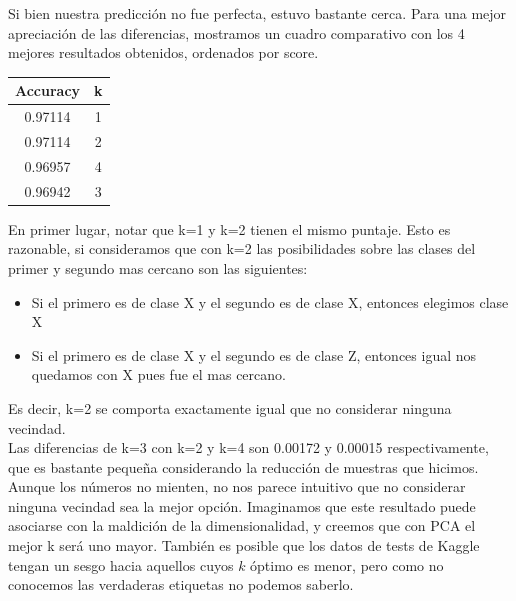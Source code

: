 Si bien nuestra predicción no fue perfecta, estuvo bastante cerca. Para una mejor apreciación de las diferencias, mostramos un cuadro comparativo con los 4 mejores resultados obtenidos, ordenados por score. \\

\begin{center}
    \begin{tabular}{| c | c |}
    \hline
     Accuracy    & k  \\ \hline
     0.97114  & 1  \\ \hline
     0.97114  & 2  \\ \hline
     0.96957  & 4  \\ \hline
     0.96942  & 3  \\ \hline
    \end{tabular}
\end{center}


En primer lugar, notar que k=1 y k=2 tienen el mismo puntaje. Esto es razonable, si consideramos que con k=2 las posibilidades sobre las clases del primer y segundo mas cercano son las siguientes: \\
\begin{itemize}
\item Si el primero es de clase X y el segundo es de clase X, entonces elegimos clase X
\item Si el primero es de clase X y el segundo es de clase Z, entonces igual nos quedamos con X pues fue el mas cercano.
\end{itemize}

Es decir, k=2 se comporta exactamente igual que no considerar ninguna vecindad. \\

Las diferencias de k=3 con k=2 y k=4 son 0.00172 y 0.00015 respectivamente, que es bastante pequeña considerando la reducción de muestras que hicimos. \\

Aunque los números no mienten, no nos parece intuitivo que no considerar ninguna vecindad sea la mejor opción. Imaginamos que este resultado puede asociarse con la maldición de la dimensionalidad, y creemos que con PCA el mejor k será uno mayor. También es posible que los datos de tests de Kaggle tengan un sesgo hacia aquellos cuyos $k$ óptimo es menor, pero como no conocemos las verdaderas etiquetas no podemos saberlo. \\

